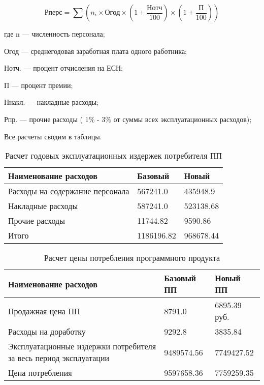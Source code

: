 \begin{equation}
	Рперс = \sum{}(n_i \times{} Огод \times (1 + \frac{Нотч}{100}) \times{} (1 + \frac{П}{100}))
\end{equation}

\begin{ESKDexplanation}
	\item[где ]{} n --- численность персонала;
	\item{} Огод --- среднегодовая заработная плата одного работника;
	\item{} Нотч. --- процент отчисления на ЕСН;
	\item{} П --- процент премии;
	\item{} Ннакл. --- накладные расходы;
	\item{} Рпр. --- прочие расходы ( 1\% - 3\%  от суммы всех эксплуатационных расходов);
\end{ESKDexplanation}

\begin{par}
Все расчеты сводим в таблицы.
\end{par}

\begin{par}
\begin{table}
\caption{Расчет годовых эксплуатационных издержек потребителя ПП}
\begin{tabular}{|l|p{5cm}|p{3cm}|}
\hline{}
Наименование расходов & Базовый & Новый \\
\hline{}
Расходы на содержание персонала & 567241.0 & 435948.9\\
\hline{}
Накладные расходы & 587241.0 & 523138.68\\
\hline{}
Прочие расходы & 11744.82 & 9590.86 \\
\hline{}
Итого & 1186196.82 & 968678.44 \\
\hline
\end{tabular}
\label{table:yearEkspIzd}
\end{table}
\end{par}


\begin{par}
\begin{table}
\caption{Расчет цены потребления программного продукта}
\begin{tabular}{|p{9cm}|p{4cm}|p{3cm}|}
\hline{}
Наименование расходов &  Базовый ПП & Новый ПП \\
\hline{}
Продажная цена ПП &  8791.0 & 6895.39 руб. \\
\hline{}
Расходы на доработку & 9292.8 & 3835.84 \\
\hline{}
Эксплуатационные издержки потребителя за весь период эксплуатации & 9489574.56 & 7749427.52 \\
\hline{}
Цена потребления & 9597658.36 & 7759259.35\\
\hline
\end{tabular}
\label{table:zhenaPotreblenija}
\end{table}
\end{par}

